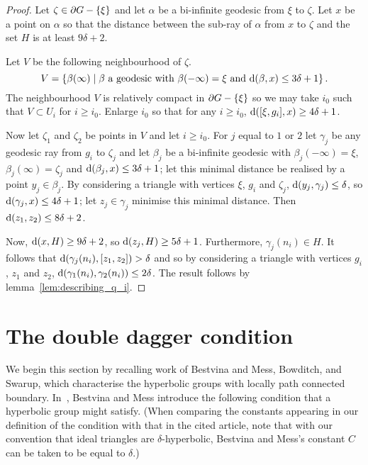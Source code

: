 \documentclass[a4paper]{article}
\begin{document}
\begin{proof}
  Let $\zeta \in \partial G - \left\{\xi\right\}$ and let $\alpha$ be a bi-infinite
  geodesic from $\xi$ to $\zeta$. Let $x$ be a point on $\alpha$ so that the
  distance between the sub-ray of $\alpha$ from $x$ to $\zeta$ and the set $H$
  is at least $9\delta+2$.

  Let $V$ be the following neighbourhood of $\zeta$.
  \begin{equation*}
    V = \left\{\beta(\infty) \mid \text{$\beta$ a geodesic with
            $\beta(-\infty) = \xi$ and $\operatorname{d}(\beta, x) \leq 3\delta+1$}\right\}.
  \end{equation*}
  The neighbourhood $V$ is relatively compact in $\partial G - \left\{\xi\right\}$ so
  we may take $i_0$ such that $V \subset U_i$ for $i \geq i_0$. Enlarge $i_0$
  so that for any $i \geq i_0$, $\operatorname{d}([\xi, g_i], x) \geq 4\delta+1$.

  Now let $\zeta_1$ and $\zeta_2$ be points in $V$ and let $i \geq i_0$. For
  $j$ equal to $1$ or $2$ let $\gamma_j$ be any geodesic ray from $g_i$ to
  $\zeta_j$ and let $\beta_j$ be a bi-infinite geodesic with $\beta_j(-\infty) =
  \xi$, $\beta_j(\infty) = \zeta_j$ and $\operatorname{d}(\beta_j, x) \leq 3\delta+1$; let
  this minimal distance be realised by a point $y_j \in \beta_j$. By
  considering a triangle with vertices $\xi$, $g_i$ and $\zeta_j$, $\operatorname{d}(y_j,
  \gamma_j) \leq \delta$, so $\operatorname{d}(\gamma_j, x) \leq 4\delta+1$; let $z_j \in
  \gamma_j$ minimise this minimal distance. Then $\operatorname{d}(z_1, z_2) \leq
  8\delta+2$.

  Now, $\operatorname{d}(x, H) \geq 9\delta+2$, so $\operatorname{d}(z_j, H) \geq 5\delta+1$.
  Furthermore, $\gamma_j(n_i) \in H$. It follows that $\operatorname{d}(\gamma_j(n_i), [z_1,
  z_2]) > \delta$ and so by considering a triangle with vertices $g_i$, $z_1$
  and $z_2$, $\operatorname{d}(\gamma_1(n_i), \gamma_2(n_i)) \leq 2\delta$. The result
  follows by lemma~\ref{lem:describing_q_i}. 
\end{proof}

\section{The double dagger condition}\label{sec:double_dagger}

We begin this section by recalling work of Bestvina and Mess, Bowditch, and
Swarup, which characterise the hyperbolic groups with locally path connected
boundary. In~\cite{bestvinamess91}, Bestvina and Mess introduce the following
condition that a hyperbolic group might satisfy. (When comparing the constants
appearing in our definition of the condition with that in the cited article, note
that with our convention that ideal triangles are $\delta$-hyperbolic, Bestvina
and Mess's constant $C$ can be taken to be equal to $\delta$.)
\end{document}
